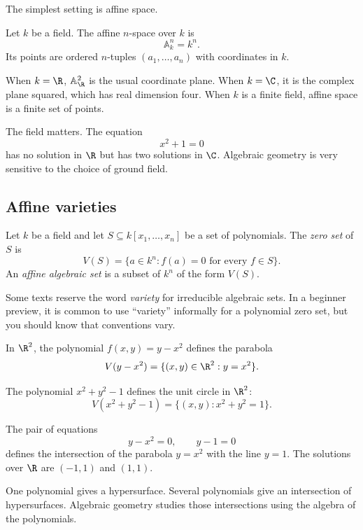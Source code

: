 The simplest setting is affine space.

\begin{definition}
Let $k$ be a field. The affine $n$-space over $k$ is
\[
\mathbb{A}^n_k=k^n.
\]
Its points are ordered $n$-tuples $(a_1,\ldots,a_n)$ with coordinates in $k$.
\end{definition}

When $k=\R$, $\mathbb{A}^2_\R$ is the usual coordinate plane. When $k=\C$, it is
the complex plane squared, which has real dimension four. When $k$ is a finite
field, affine space is a finite set of points.

The field matters. The equation
\[
x^2+1=0
\]
has no solution in $\R$ but has two solutions in $\C$. Algebraic geometry is
very sensitive to the choice of ground field.

\subsection{Affine varieties}

\begin{definition}
Let $k$ be a field and let $S\subseteq k[x_1,\ldots,x_n]$ be a set of
polynomials. The \emph{zero set} of $S$ is
\[
V(S)=\{a\in k^n:f(a)=0\text{ for every }f\in S\}.
\]
An \emph{affine algebraic set} is a subset of $k^n$ of the form $V(S)$.
\end{definition}

Some texts reserve the word \emph{variety} for irreducible algebraic sets. In a
beginner preview, it is common to use ``variety'' informally for a polynomial
zero set, but you should know that conventions vary.

\begin{example}
In $\R^2$, the polynomial $f(x,y)=y-x^2$ defines the parabola
\[
V(y-x^2)=\{(x,y)\in\R^2:y=x^2\}.
\]
\end{example}

\begin{example}
The polynomial $x^2+y^2-1$ defines the unit circle in $\R^2$:
\[
V(x^2+y^2-1)=\{(x,y):x^2+y^2=1\}.
\]
\end{example}

\begin{example}
The pair of equations
\[
y-x^2=0,\qquad y-1=0
\]
defines the intersection of the parabola $y=x^2$ with the line $y=1$. The
solutions over $\R$ are $(-1,1)$ and $(1,1)$.
\end{example}

\begin{intuitionbox}
One polynomial gives a hypersurface. Several polynomials give an intersection
of hypersurfaces. Algebraic geometry studies those intersections using the
algebra of the polynomials.
\end{intuitionbox}

